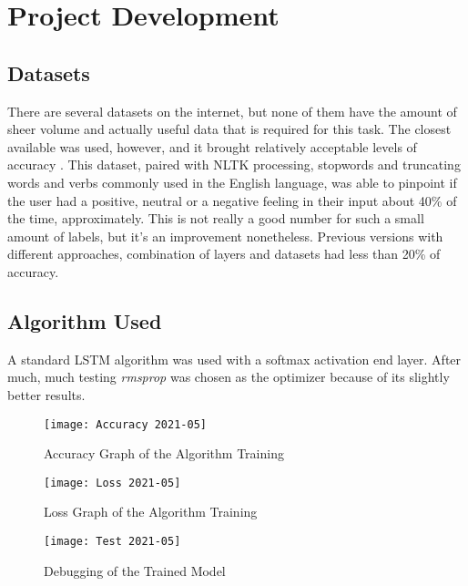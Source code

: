\chapter{Project Development}

\section{Datasets}
There are several datasets on the internet, but none of them have the amount of sheer volume and actually useful data that is required for this task. The closest available was used, however, and it brought relatively acceptable levels of accuracy \citep{rf7}.
This dataset, paired with NLTK processing, stopwords and truncating words and verbs commonly used in the English language, was able to pinpoint if the user had a positive, neutral or a negative feeling in their input about 40\% of the time, approximately.
This is not really a good number for such a small amount of labels, but it's an improvement nonetheless. Previous versions with different approaches, combination of layers and datasets had less than 20\% of accuracy.
\pagebreak

\section{Algorithm Used}
A standard LSTM algorithm was used with a softmax activation end layer. After much, much testing \textit{rmsprop} was chosen as the optimizer because of its slightly better results.
\begin{figure}[!h]
	\centering
	\texttt{[image: Accuracy 2021-05]}
	\caption{Accuracy Graph of the Algorithm Training}
	\label{fig:accuracy}
	\texttt{[image: Loss 2021-05]}
	\caption{Loss Graph of the Algorithm Training}
	\label{fig:loss}
\end{figure}
\begin{figure}[!h]
	\centering
	\texttt{[image: Test 2021-05]}
	\caption{Debugging of the Trained Model}
	\label{fig:test}
\end{figure}
\pagebreak

